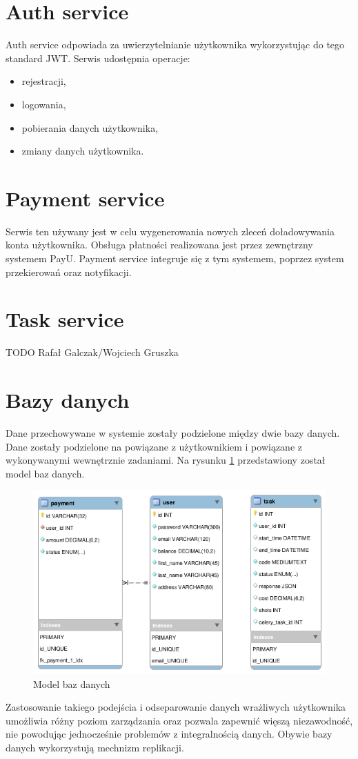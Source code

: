 \section{Auth service}
Auth service odpowiada za uwierzytelnianie użytkownika wykorzystując do tego standard JWT. Serwis udostępnia operacje:
\begin{itemize}
    \item rejestracji,
    \item logowania,
    \item pobierania danych użytkownika,
    \item zmiany danych użytkownika.
\end{itemize}
\section{Payment service}
Serwis ten używany jest w celu wygenerowania nowych zleceń doładowywania konta użytkownika. Obsługa płatności realizowana jest przez zewnętrzny systemem PayU. Payment service integruje się z tym systemem, poprzez system przekierowań oraz notyfikacji.
\section{Task service}
TODO Rafał Galczak/Wojciech Gruszka
\section{Bazy danych}
Dane przechowywane w systemie zostały podzielone między dwie bazy danych. Dane zostały podzielone na powiązane z użytkownikiem i powiązane z wykonywanymi wewnętrznie zadaniami. Na rysunku \ref{fig:db_model} przedstawiony został model baz danych.
\begin{figure}[!ht]
    \centering
    \includegraphics[width=\textwidth]{images/database.png}
    \caption{Model baz danych}
    \label{fig:db_model}
\end{figure}
Zastosowanie takiego podejścia i odseparowanie danych wrażliwych użytkownika umożliwia różny poziom zarządzania oraz pozwala zapewnić więszą niezawodność, nie powodując jednocześnie problemów z integralnością danych. Obywie bazy danych wykorzystują mechnizm replikacji.
